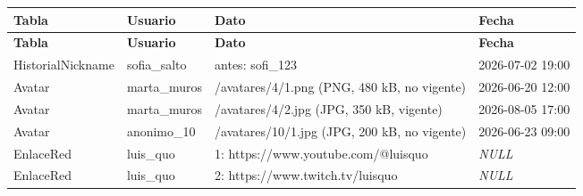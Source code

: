 \begin{center}\footnotesize\setlength{\tabcolsep}{2pt}
\begin{longtable}{|L{91.8pt}|L{59.8pt}|L{220.8pt}|L{81.1pt}|}
\hline
\textbf{\hspace{0pt}Tabla} & \textbf{\hspace{0pt}Usuario} & \textbf{\hspace{0pt}Dato} & \textbf{\hspace{0pt}Fecha} \\ \hline
\endfirsthead
\hline
\textbf{\hspace{0pt}Tabla} & \textbf{\hspace{0pt}Usuario} & \textbf{\hspace{0pt}Dato} & \textbf{\hspace{0pt}Fecha} \\ \hline
\endhead
HistorialNickname & sofia\_\allowbreak{}salto & antes: sofi\_\allowbreak{}123 & 2026-07-02 19:00 \\ \hline
Avatar & marta\_\allowbreak{}muros & /\allowbreak{}avatares/\allowbreak{}4/\allowbreak{}1.\allowbreak{}png (PNG, 480 kB, no vigente) & 2026-06-20 12:00 \\ \hline
Avatar & marta\_\allowbreak{}muros & /\allowbreak{}avatares/\allowbreak{}4/\allowbreak{}2.\allowbreak{}jpg (JPG, 350 kB, vigente) & 2026-08-05 17:00 \\ \hline
Avatar & anonimo\_\allowbreak{}10 & /\allowbreak{}avatares/\allowbreak{}10/\allowbreak{}1.\allowbreak{}jpg (JPG, 200 kB, no vigente) & 2026-06-23 09:00 \\ \hline
EnlaceRed & luis\_\allowbreak{}quo & 1: https:/\allowbreak{}/\allowbreak{}www.\allowbreak{}youtube.\allowbreak{}com/\allowbreak{}@\allowbreak{}luisquo & \textit{NULL} \\ \hline
EnlaceRed & luis\_\allowbreak{}quo & 2: https:/\allowbreak{}/\allowbreak{}www.\allowbreak{}twitch.\allowbreak{}tv/\allowbreak{}luisquo & \textit{NULL} \\ \hline
\end{longtable}
\end{center}
